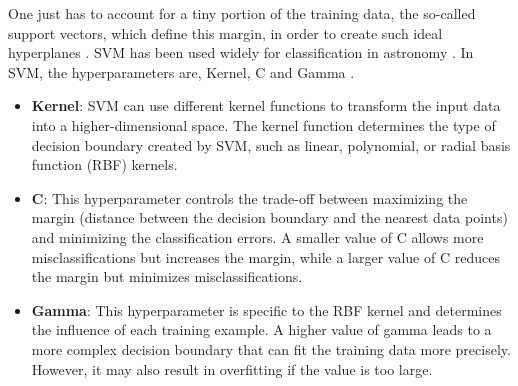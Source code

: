 One just has to account for a tiny portion of the training data, the so-called support vectors, which define this margin, in order to create such ideal hyperplanes \citep{SVMCortes1995}. SVM has been used widely for classification in astronomy \citep{Zhang2012} \citep{Kim2016}. In SVM, the hyperparameters are, Kernel, C and Gamma \citep{sklearn_api}.
\begin{itemize}
\item \textbf{Kernel}: SVM can use different kernel functions to transform the input data into a higher-dimensional space. The kernel function determines the type of decision boundary created by SVM, such as linear, polynomial, or radial basis function (RBF) kernels.
\item \textbf{C}: This hyperparameter controls the trade-off between maximizing the margin (distance between the decision boundary and the nearest data points) and minimizing the classification errors. A smaller value of C allows more misclassifications but increases the margin, while a larger value of C reduces the margin but minimizes misclassifications.
\item \textbf{Gamma}: This hyperparameter is specific to the RBF kernel and determines the influence of each training example. A higher value of gamma leads to a more complex decision boundary that can fit the training data more precisely. However, it may also result in overfitting if the value is too large.
\end{itemize}




